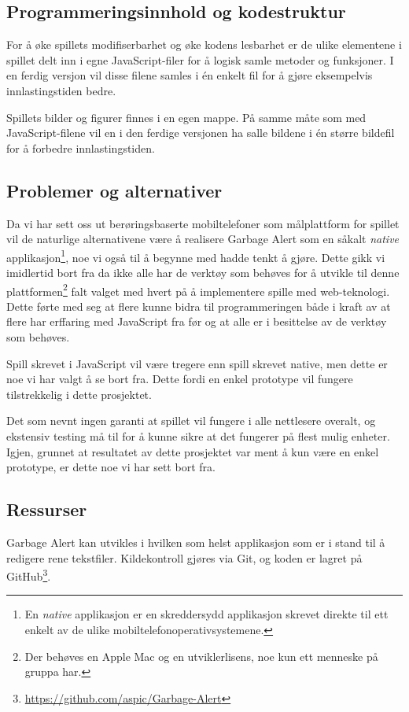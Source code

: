 \subsection{Programmeringsinnhold og kodestruktur}

For å øke spillets modifiserbarhet og øke kodens lesbarhet er de ulike elementene i spillet delt inn i egne JavaScript-filer for å logisk samle metoder og funksjoner. I en ferdig versjon vil disse filene samles i én enkelt fil for å gjøre eksempelvis innlastingstiden bedre.

Spillets bilder og figurer finnes i en egen mappe. På samme måte som med JavaScript-filene vil en i den ferdige versjonen ha salle bildene i én større bildefil for å forbedre innlastingstiden.


\subsection{Problemer og alternativer}
Da vi har sett oss ut berøringsbaserte mobiltelefoner som målplattform for spillet vil de naturlige alternativene være å realisere Garbage Alert som en såkalt \emph{native} applikasjon\footnote{En \emph{native} applikasjon er en skreddersydd applikasjon skrevet direkte til ett enkelt av de ulike mobiltelefonoperativsystemene.}, noe vi også til å begynne med hadde tenkt å gjøre. Dette gikk vi imidlertid bort fra da ikke alle har de verktøy som behøves for å utvikle til denne plattformen\footnote{Der behøves en Apple Mac og en utviklerlisens, noe kun ett menneske på gruppa har.} falt valget med hvert på å implementere spille med web-teknologi. Dette førte med seg at flere kunne bidra til programmeringen både i kraft av at flere har erffaring med JavaScript fra før og at alle er i besittelse av de verktøy som behøves.

Spill skrevet i JavaScript vil være tregere enn spill skrevet native, men dette er noe vi har valgt å se bort fra. Dette fordi en enkel prototype vil fungere tilstrekkelig i dette prosjektet.

Det som nevnt ingen garanti at spillet vil fungere i alle nettlesere overalt, og ekstensiv testing må til for å kunne sikre at det fungerer på flest mulig enheter. Igjen, grunnet at resultatet av dette prosjektet var ment å kun være en enkel prototype, er dette noe vi har sett bort fra.




\subsection{Ressurser}
Garbage Alert kan utvikles i hvilken som helst applikasjon som er i stand til å redigere rene tekstfiler. Kildekontroll gjøres via Git, og koden er lagret på GitHub\footnote{\url{https://github.com/aspic/Garbage-Alert}}.


